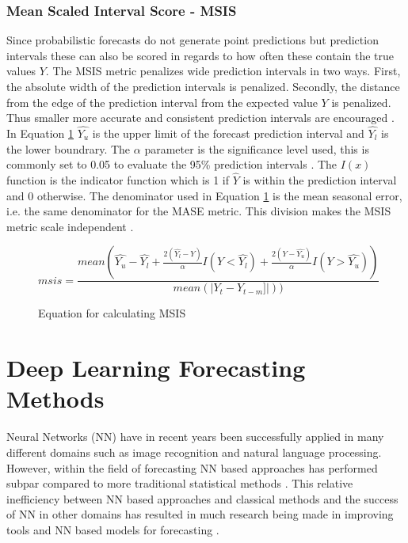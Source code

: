 \subsubsection{Mean Scaled Interval Score - MSIS}
\label{sec:msis}
Since probabilistic forecasts do not generate point predictions but prediction intervals these can also be scored in regards to how often these contain the true values \(Y\). The MSIS metric penalizes wide prediction intervals in two ways. First, the absolute width of the prediction intervals is penalized. Secondly, the distance from the edge of the prediction interval from the expected value \(Y\) is penalized. Thus smaller more accurate and consistent prediction intervals are encouraged \cite{makridakis_m4_2020}. In Equation \ref{eq:MSIS} \(\hat{Y_u}\) is the upper limit of the forecast prediction interval and \(\hat{Y_l}\) is the lower boundrary. The \(\alpha\) parameter is the significance level used, this is commonly set to 0.05 to evaluate the 95\% prediction intervals \cite{makridakis_m4_2020,gluonts-github}. The \(I(x)\) function is the indicator function which is 1 if \(\hat{Y}\) is within the prediction interval and 0 otherwise. The denominator used in Equation \ref{eq:MSIS} is the mean seasonal error, i.e. the same denominator for the MASE metric. This division makes the MSIS metric scale independent \cite{gluonts-github,makridakis_m4_2020}.

\begin{figure}[h]
  \[msis = \frac{mean(\hat{Y_u} - \hat{Y_l} + \frac{2(\hat{Y_l}-Y)}{\alpha}I(Y<\hat{Y_l}) + \frac{2(Y-\hat{Y_u})}{\alpha}I(Y>\hat{Y_u}))}{mean(|Y_t - Y_{t-m}]|))}\]
  \caption{Equation for calculating MSIS}
  \label{eq:MSIS}
\end{figure}

\section{Deep Learning Forecasting Methods}
\label{sec:deep_learning_methods}
Neural Networks (NN) have in recent years been successfully applied in many different domains such as image recognition and natural language processing. However, within the field of forecasting NN based approaches has performed subpar compared to more traditional statistical methods \cite{m3_competition,makridakis_m4_2020,oreshkin_n_beats_2020, other_thesis}. This relative inefficiency between NN based approaches and classical methods and the success of NN in other domains has resulted in much research being made in improving tools and NN based models for forecasting \cite{gluonts_paper}.

